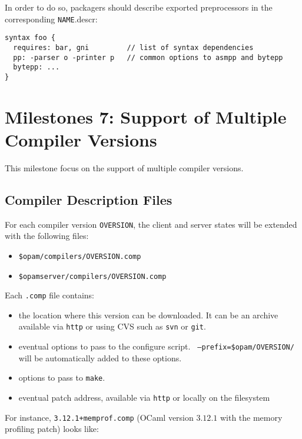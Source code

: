 \documentclass[a4paper,11pt]{article}
\begin{document}
\begin{itemize}
In order to do so, packagers should describe exported preprocessors in
the corresponding {\tt NAME}.descr:

\begin{verbatim}
syntax foo {
  requires: bar, gni         // list of syntax dependencies
  pp: -parser o -printer p   // common options to asmpp and bytepp
  bytepp: ...
}
\end{verbatim}

\section{Milestones 7: Support of Multiple Compiler Versions}

This milestone focus on the support of multiple compiler versions.

\subsection{Compiler Description Files}

For each compiler version {\tt OVERSION}, the client and server states
will be extended with the following files:

\begin{itemize}
\item {\tt \$opam/compilers/OVERSION.comp}
\item {\tt \$opamserver/compilers/OVERSION.comp}
\end{itemize}

Each {\tt .comp} file contains:

\begin{itemize}

\item the location where this version can be downloaded. It can be an
  archive available via {\tt http} or using CVS such as {\tt svn} or
  {\tt git}.

\item eventual options to pass to the configure script. {\tt
  --prefix=\$opam/OVERSION/} will be automatically added to these
  options.

\item options to pass to {\tt make}.

\item eventual patch address, available via {\tt http} or locally on
  the filesystem

\end{itemize}

For instance, {\tt 3.12.1+memprof.comp} (OCaml version $3.12.1$ with
the memory profiling patch) looks like:


\end{itemize}
\end{document}
